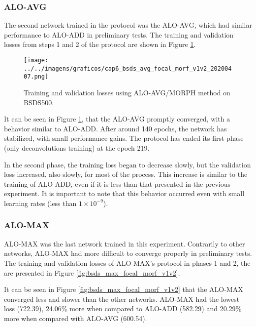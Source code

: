 \subsubsection{ALO-AVG}
\label{ssec:bsds_subexp1_avg}

The second network trained in the protocol was the ALO-AVG, which had similar performance to ALO-ADD in preliminary tests.
The training and validation losses from steps 1 and 2 of the protocol are shown in Figure \ref{fig:bsds_avg_focal_morf_v1v2}.

\begin{figure}%
  \centering
  \caption{Training and validation losses using ALO-AVG/MORPH method on BSDS500.}
  \texttt{[image: ../../imagens/graficos/cap6\_bsds\_avg\_focal\_morf\_v1v2\_20200407.png]}
  \sourceOwn
  \label{fig:bsds_avg_focal_morf_v1v2}
\end{figure}

It can be seen in Figure \ref{fig:bsds_avg_focal_morf_v1v2}, that the ALO-AVG promptly converged, with a behavior similar to ALO-ADD.
After around 140 epochs, the network has stabilized, with small performance gains. 
The protocol has ended its first phase (only deconvolutions training) at the epoch 219.

In the second phase, the training loss began to decrease slowly, but the validation loss increased, also slowly, for most of the process.
This increase is similar to the training of ALO-ADD, even if it is less than that presented in the previous experiment.
It is important to note that this behavior occurred even with small learning rates (less than $1 \times 10^{-9}$). 

\subsubsection{ALO-MAX}
\label{ssec:bsds_subexp1_max}

ALO-MAX was the last network trained in this experiment.
Contrarily to other networks, ALO-MAX had more difficult to converge properly in preliminary tests.
The training and validation losses of ALO-MAX's protocol in phases 1 and 2, the are presented in Figure \ref{fig:bsds_max_focal_morf_v1v2}.

It can be seen in Figure \ref{fig:bsds_max_focal_morf_v1v2} that the ALO-MAX converged less and slower than the other networks.
ALO-MAX had the lowest loss (722.39), 24.06\% more when compared to ALO-ADD (582.29) and 20.29\% more when compared with ALO-AVG (600.54).

